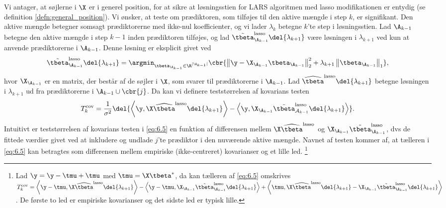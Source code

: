 Vi antager, at søjlerne i \(\X\) er i generel position, for at sikre at løsningsstien for LARS algoritmen med lasso modifikationen er entydig (se definition \ref{defn:general_position}).
Vi ønsker, at teste om prædiktoren, som tilføjes til den aktive mængde i step \(k\), er signifikant.
Den aktive mængde betegner somsagt prædiktorerne med ikke-nul koefficienter, og vi lader \(\lambda_k\) betegne \(k\)'te step i løsningsstien.
Lad \(\A_{k-1}\) betegne den aktive mængde i step \(k-1\) inden prædiktoren tilføjes, og lad \(\tilde{\tbeta}^\text{lasso}_{\A_{k-1}} \del{\lambda_{k+1}}\) være løsningen i \(\lambda_{k+1}\) ved kun at anvende prædiktorerne i \(\A_{k-1}\).
Denne løsning er eksplicit givet ved 
\begin{align*}
\tilde{\tbeta}^\text{lasso}_{\A_{k-1}} \del{\lambda_{k+1}} = \argmin_{\tbeta_{\A_{k-1}} \in \R^{\vert \A_{k-1} \vert}} \cbr{ \left\Vert \y - \X_{\A_{k-1}} \tbeta_{\A_{k-1}} \right\Vert_2^2 + \lambda_{k+1} \left\Vert \tbeta_{\A_{k-1}} \right\Vert_1},
\end{align*}
hvor \(\X_{\A_{k-1}}\) er en matrix, der består af de søjler i \(\X\), som svarer til prædiktorerne i \(\A_{k-1}\).
Lad \(\widehat{\tbeta}^\text{lasso} \del{\lambda_{k+1}}\) betegne løsningen i \(\lambda_{k+1}\) ud fra prædiktorerne i \(\A_{k-1} \cup \cbr{j}\).
Da kan vi definere teststørrelsen af kovarians testen
\begin{align}
T_k^\text{cov} = \frac{1}{\sigma^2} \del{ \left\langle \y, \X \widehat{\tbeta}^\text{lasso} \del{\lambda_{k+1}} \right\rangle - \left\langle  \y, \X_{\A_{k-1}} \tilde{\tbeta}^\text{lasso}_{\mathcal{A}_{k-1}} \del{\lambda_{k+1}} \right\rangle}. \label{eq:6.5}
\end{align}
Intuitivt er teststørrelsen af kovarians testen i \eqref{eq:6.5} en funktion af differensen mellem \(\X \widehat{\tbeta}^\text{lasso}\) og \(\X_{\A_{k-1}} \tilde{\tbeta}^\text{lasso}_{\A_{k-1}}\), dvs de fittede værdier givet ved at inkludere og undlade \(j\)'te prædiktor i den nuværende aktive mængde.
Navnet af testen kommer af, at tælleren i \eqref{eq:6.5} kan betragtes som differensen mellem empiriske (ikke-centreret) kovarianser og et lille led. 
\footnote{Lad \(\y = \y - \tmu + \tmu\) med \(\tmu = \X \tbeta^*\), da kan tælleren af \eqref{eq:6.5} omskrives \(T_k^\text{cov} = \left\langle \y - \tmu, \X \widehat{\tbeta}^\text{lasso} \del{\lambda_{k+1}} \right\rangle - \left\langle \y - \tmu, \X_{\A_{k-1}} \tilde{\tbeta}^\text{lasso}_{\A_{k-1}} \del{\lambda_{k+1}} \right\rangle + \left\langle \tmu, \X \widehat{\tbeta}^\text{lasso} \del{\lambda_{k+1}} - \X_{\A_{k-1}} \tilde{\tbeta}^\text{lasso}_{\A_{k-1}} \del{\lambda_{k+1}} \right\rangle\).
De første to led er empiriske kovarianser og det sidste led er typisk lille.}
